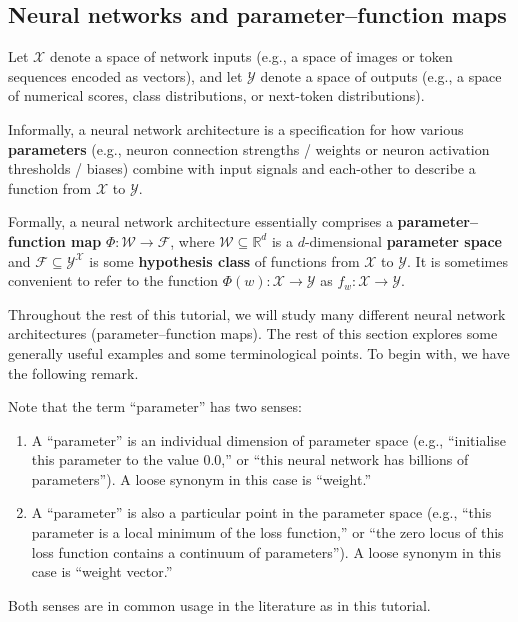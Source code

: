 \documentclass[11pt]{article}
\newcommand{\R}{\mathbb{R}}
\newcommand{\X}{\mathcal{X}}
\newcommand{\Y}{\mathcal{Y}}
\newcommand{\W}{\mathcal{W}}
\newcommand{\F}{\mathcal{F}}
\begin{document}
\subsection{Neural networks and parameter--function maps}

Let $\X$ denote a space of network inputs (e.g., a space of images or token
sequences encoded as vectors), and let $\Y$ denote a space of outputs (e.g., a
space of numerical scores, class distributions, or next-token distributions).

Informally, a neural network architecture is a specification for how various
\textbf{parameters} (e.g., neuron connection strengths / weights or neuron
activation thresholds / biases) combine with input signals and each-other to
describe a function from $\X$ to $\Y$.

Formally, a neural network architecture essentially comprises a
\textbf{parameter--function map}
    $\Phi : \W \to \F$, where
$\W \subseteq \R^d$ is a $d$-dimensional \textbf{parameter space} and 
$\F \subseteq \Y^\X$ is some \textbf{hypothesis class} of functions from $\X$
to $\Y$.
%
It is sometimes convenient to refer to the function $\Phi(w) : \X \to \Y$ as
$f_w : \X \to \Y$.

Throughout the rest of this tutorial, we will study many different neural
network architectures (parameter--function maps). The rest of this section
explores some generally useful examples and some terminological points. To
begin with, we have the following remark.

\begin{remark}[Parameters]
    Note that the term ``parameter'' has two senses:
    \begin{enumerate}
        \item
            A ``parameter'' is an individual dimension of parameter space
            (e.g., ``initialise this parameter to the value $0.0$,'' or ``this
            neural network has billions of parameters''). A loose synonym in
            this case is ``weight.''
        \item
            A ``parameter'' is also a particular point in the parameter space
            (e.g., ``this parameter is a local minimum of the loss function,''
            or ``the zero locus of this loss function contains a continuum of
            parameters''). A loose synonym in this case is ``weight vector.''
    \end{enumerate}
    Both senses are in common usage in the literature as in this tutorial.
\end{remark}
\end{document}
